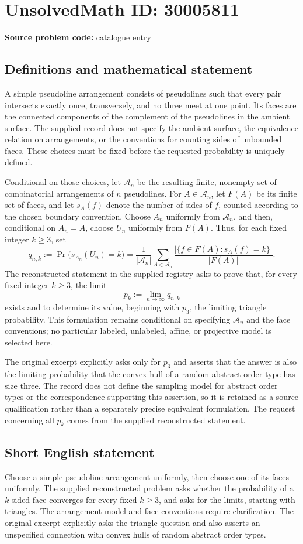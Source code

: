 \documentclass[11pt]{article}
\begin{document}
\section*{UnsolvedMath ID: 30005811}
\textbf{Source problem code:} catalogue entry
\subsection{Definitions and mathematical statement}
A simple pseudoline arrangement consists of pseudolines such that every pair intersects exactly once, transversely, and no three meet at one point. Its faces are the connected components of the complement of the pseudolines in the ambient surface. The supplied record does not specify the ambient surface, the equivalence relation on arrangements, or the conventions for counting sides of unbounded faces. These choices must be fixed before the requested probability is uniquely defined.

Conditional on those choices, let \(\mathcal A_n\) be the resulting finite, nonempty set of combinatorial arrangements of \(n\) pseudolines. For \(A\in\mathcal A_n\), let \(F(A)\) be its finite set of faces, and let \(s_A(f)\) denote the number of sides of \(f\), counted according to the chosen boundary convention. Choose \(A_n\) uniformly from \(\mathcal A_n\), and then, conditional on \(A_n=A\), choose \(U_n\) uniformly from \(F(A)\). Thus, for each fixed integer \(k\geq 3\), set
\[
q_{n,k}:=\Pr\bigl(s_{A_n}(U_n)=k\bigr)
=\frac{1}{|\mathcal A_n|}\sum_{A\in\mathcal A_n}
\frac{|\{f\in F(A):s_A(f)=k\}|}{|F(A)|}.
\]
The reconstructed statement in the supplied registry asks to prove that, for every fixed integer \(k\geq 3\), the limit
\[
p_k:=\lim_{n\to\infty}q_{n,k}
\]
exists and to determine its value, beginning with \(p_3\), the limiting triangle probability. This formulation remains conditional on specifying \(\mathcal A_n\) and the face conventions; no particular labeled, unlabeled, affine, or projective model is selected here.

The original excerpt explicitly asks only for \(p_3\) and asserts that the answer is also the limiting probability that the convex hull of a random abstract order type has size three. The record does not define the sampling model for abstract order types or the correspondence supporting this assertion, so it is retained as a source qualification rather than a separately precise equivalent formulation. The request concerning all \(p_k\) comes from the supplied reconstructed statement.
\subsection{Short English statement}
Choose a simple pseudoline arrangement uniformly, then choose one of its faces uniformly. The supplied reconstructed problem asks whether the probability of a \(k\)-sided face converges for every fixed \(k\geq 3\), and asks for the limits, starting with triangles. The arrangement model and face conventions require clarification. The original excerpt explicitly asks the triangle question and also asserts an unspecified connection with convex hulls of random abstract order types.
\end{document}

